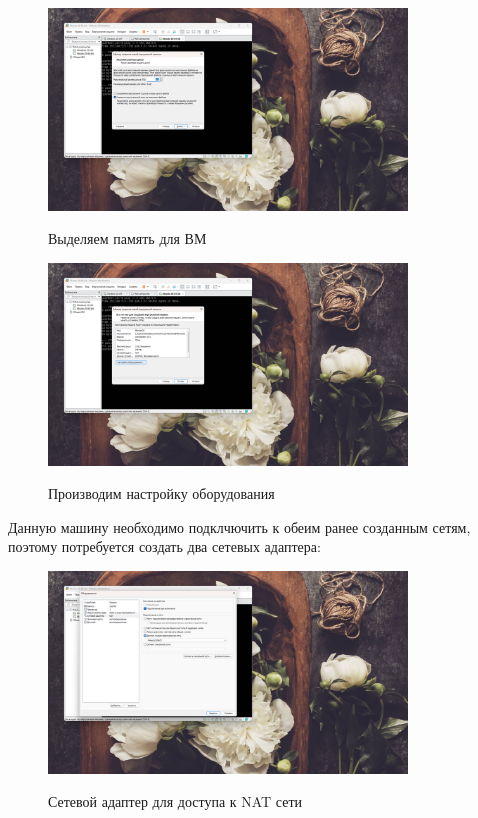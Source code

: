 \documentclass[a4paper]{article}
\begin{document}
  \begin{figure}[H]
    \centering
    \includegraphics[width=0.85\textwidth]{06_00 (79)}
    \label{img:79}
    \caption{Выделяем память для ВМ}
  \end{figure}
  
  \begin{figure}[H]
    \centering
    \includegraphics[width=0.85\textwidth]{06_00 (80)}
    \label{img:80}
    \caption{Производим настройку оборудования}
  \end{figure}
  
  Данную машину необходимо подклчючить к обеим ранее созданным сетям,
  поэтому потребуется создать два сетевых адаптера:

  \begin{figure}[H]
    \centering
    \includegraphics[width=0.85\textwidth]{06_00 (81)}
    \label{img:81}
    \caption{Сетевой адаптер для доступа к NAT сети}
  \end{figure}
  
\end{document}
